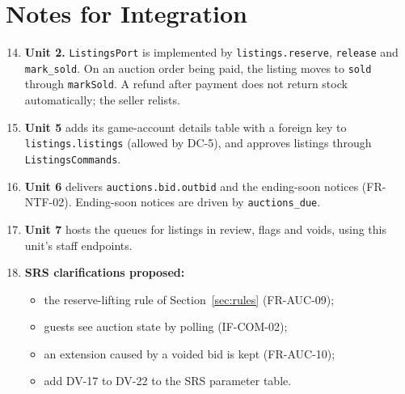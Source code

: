 \documentclass[11pt,a4paper]{article}
\begin{document}
\section{Notes for Integration}
\begin{enumerate}[label=\textbf{I-\arabic*}, leftmargin=*, nosep]
  \setcounter{enumi}{13}
  \item \textbf{Unit 2.} \texttt{ListingsPort} is implemented by \texttt{listings.reserve}, \texttt{release} and \texttt{mark\_sold}. On an auction order being paid, the listing moves to \texttt{sold} through \texttt{markSold}. A refund after payment does not return stock automatically; the seller relists.
  \item \textbf{Unit 5} adds its game-account details table with a foreign key to \texttt{listings.listings} (allowed by DC-5), and approves listings through \texttt{ListingsCommands}.
  \item \textbf{Unit 6} delivers \texttt{auctions.bid.outbid} and the ending-soon notices (FR-NTF-02). Ending-soon notices are driven by \texttt{auctions\_due}.
  \item \textbf{Unit 7} hosts the queues for listings in review, flags and voids, using this unit's staff endpoints.
  \item \textbf{SRS clarifications proposed:}
  \begin{itemize}[nosep]
    \item the reserve-lifting rule of Section~\ref{sec:rules} (FR-AUC-09);
    \item guests see auction state by polling (IF-COM-02);
    \item an extension caused by a voided bid is kept (FR-AUC-10);
    \item add DV-17 to DV-22 to the SRS parameter table.
  \end{itemize}
\end{enumerate}

\appendix
\end{document}
